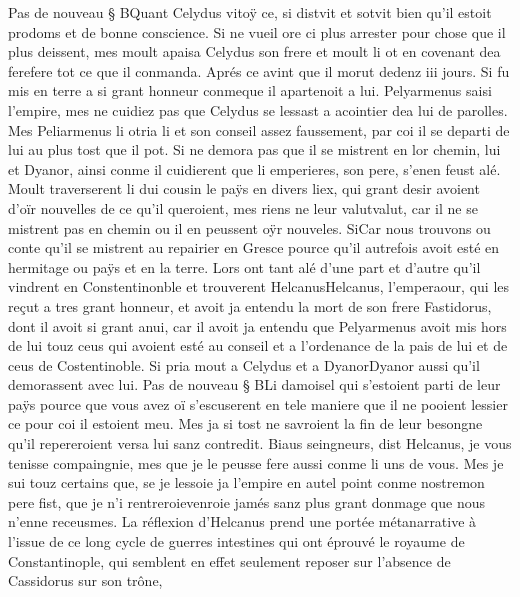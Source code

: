 \documentclass{article}
\begin{document}
\begin{pages}
\pstart Pas de nouveau § BQuant Celydus 
   vitoÿ ce,
   si distvit et sotvit bien 
   qu’il estoit prodoms et de bonne conscience. 
   Si ne vueil ore ci plus arrester pour chose que il 
   plus deissent, 
   mes moult apaisa Celydus son frere 
   et moult li ot en covenant dea 
   ferefere tot ce que il conmanda. Aprés ce avint que il morut dedenz 
   iii jours. Si fu mis en terre a si grant honneur conmeque 
   il apartenoit a lui. 
   Pelyarmenus saisi l’empire, mes ne cuidiez pas que Celydus 
   se lessast a acointier 
   dea lui de parolles. 
   Mes Peliarmenus li otria li et son conseil assez faussement, par coi il se departi de lui 
   au plus tost que il pot. Si ne demora pas que il se mistrent en lor chemin, lui et Dyanor, 
   ainsi conme il cuidierent que 
   li emperieres, son pere, 
   s'enen feust alé. \pend
\pstart Moult traverserent li dui cousin le paÿs en divers liex, qui grant desir avoient d’oïr nouvelles 
   de ce qu’il queroient, mes riens ne leur valutvalut, car il ne se mistrent pas en
      chemin ou il en peussent oÿr nouveles. 
   SiCar nous trouvons ou conte qu’il se mistrent 
   au repairier en Gresce pource qu’il autrefois avoit esté en 
   hermitage ou paÿs et en la terre. 
   Lors ont tant alé d’une part et d’autre qu’il vindrent en Constentinonble et trouverent 
   HelcanusHelcanus, l'emperaour, 
   qui les reçut a tres grant honneur, et avoit ja entendu la mort de son frere 
      Fastidorus, dont il avoit si grant anui, car il avoit ja entendu 
   que Pelyarmenus avoit mis hors de lui touz ceus qui avoient esté au conseil 
   et a l’ordenance de la pais de lui et de ceus de Costentinoble. 
   Si pria mout a Celydus et a 
   DyanorDyanor aussi 
   qu’il demorassent avec lui. \pend
\pstart Pas de nouveau § BLi damoisel qui s’estoient parti de leur paÿs pource 
   que vous avez oï s’escuserent en tele maniere que il ne pooient lessier ce pour coi il estoient meu. 
   Mes ja si tost ne savroient la fin de leur besongne qu’il repereroient 
   versa lui sanz contredit.
   Biaus seingneurs, dist Helcanus, je vous tenisse compaingnie, 
   mes que je le peusse fere aussi conme li uns de vous. Mes je sui touz certains que, se je lessoie ja l’empire en autel point conme 
      nostremon pere fist, 
      que je n’i rentreroievenroie jamés sanz plus grant donmage que nous 
      n’enne receusmes.
   La réflexion d'Helcanus prend une portée métanarrative à l'issue de ce long cycle de guerres intestines
   qui ont éprouvé le royaume de Constantinople, qui semblent en effet seulement reposer sur l'absence de Cassidorus sur son trône, 

\end{pages}
\end{document}
